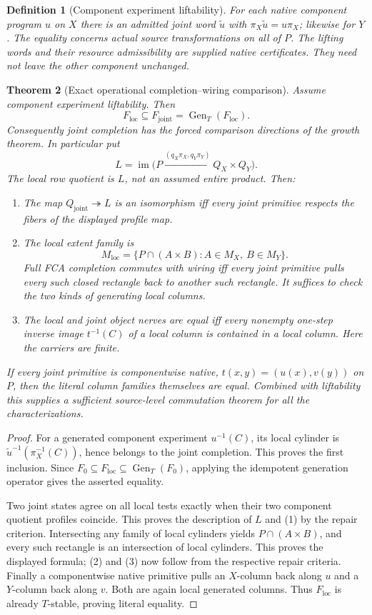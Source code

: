\documentclass[11pt]{article}
\newtheorem{theorem}{Theorem}[section]
\newtheorem{definition}[theorem]{Definition}
\theoremstyle{remark}\newtheorem{remark}[theorem]{Remark}
\newcommand{\Gen}{\operatorname{Gen}}
\newcommand{\im}{\operatorname{im}}
\begin{document}
\begin{definition}[Component experiment liftability]
For each native component program $u$ on $X$ there is an admitted
joint word $\widetilde u$ with
$\pi_X\widetilde u=u\pi_X$; likewise for $Y$.
The equality concerns actual source transformations on all of $P$.
The lifting words and their resource admissibility are supplied native
certificates. They need not leave the other component unchanged.
\end{definition}
\begin{theorem}[Exact operational completion--wiring comparison]
Assume component experiment liftability. Then
\[
 F_{\mathrm{loc}}\subseteq F_{\mathrm{joint}}
 =\Gen_T(F_{\mathrm{loc}}).
\]
Consequently joint completion has the forced comparison directions
of the growth theorem. In particular put
\[
 L=\im\bigl(P\xrightarrow{(q_X\pi_X,q_Y\pi_Y)}Q_X\times Q_Y\bigr).
\]
The local row quotient is $L$, not an assumed entire product. Then:
\begin{enumerate}
\item The map $Q_{\mathrm{joint}}\twoheadrightarrow L$ is an
isomorphism iff every joint primitive respects the fibers of the
displayed profile map.
\item The local extent family is
\[
 M_{\mathrm{loc}}=
 \{P\cap(A\times B):A\in M_X,\ B\in M_Y\}.
\]
Full FCA completion commutes with wiring iff every joint primitive
pulls every such closed rectangle back to another such rectangle.
It suffices to check the two kinds of generating local columns.
\item The local and joint object nerves are equal iff every nonempty
one-step inverse image $t^{-1}(C)$ of a local column is contained in
a local column. Here the carriers are finite.
\end{enumerate}
If every joint primitive is componentwise native,
$t(x,y)=(u(x),v(y))$ on $P$, then the literal column families themselves
are equal. Combined with liftability this supplies a sufficient
source-level commutation theorem for all the characterizations.
\end{theorem}
\begin{proof}
For a generated component experiment $u^{-1}(C)$, its local cylinder
is $\widetilde u^{-1}(\pi_X^{-1}(C))$, hence belongs to the joint
completion. This proves the first inclusion. Since
$F_0\subseteq F_{\mathrm{loc}}\subseteq\Gen_T(F_0)$, applying the
idempotent generation operator gives the asserted equality.

Two joint states agree on all local tests exactly when their two
component quotient profiles coincide. This proves the description of
$L$ and (1) by the repair criterion. Intersecting any family of local
cylinders yields $P\cap(A\times B)$, and every such rectangle is an
intersection of local cylinders. This proves the displayed formula;
(2) and (3) now follow from the respective repair criteria. Finally a
componentwise native primitive pulls an $X$-column back along $u$ and
a $Y$-column back along $v$. Both are again local generated columns.
Thus $F_{\mathrm{loc}}$ is already $T$-stable, proving literal equality.
\end{proof}
\end{document}
